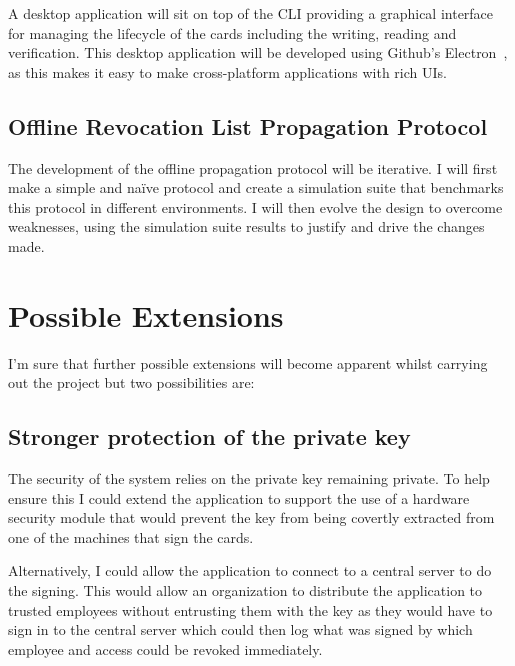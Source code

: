 \documentclass[a4paper, 12pt]{article}
\begin{document}
  A desktop application will sit on top of the CLI providing a graphical
  interface for managing the lifecycle of the cards including the writing,
  reading and verification. This desktop application will be developed using
  Github's Electron~\cite{electron}, as this makes it easy to make
  cross-platform applications with rich UIs.


  \subsection*{Offline Revocation List Propagation Protocol}

  The development of the offline propagation protocol will be iterative. I will
  first make a simple and naïve protocol and create a simulation suite that
  benchmarks this protocol in different environments\footnotemark{}. I will then
  evolve the design to overcome weaknesses, using the simulation suite results
  to justify and drive the changes made.


  \section*{Possible Extensions}

  I'm sure that further possible extensions will become apparent whilst carrying
  out the project but two possibilities are:


  \subsection*{Stronger protection of the private key}

  The security of the system relies on the private key remaining private. To
  help ensure this I could extend the application to support the use of a
  hardware security module that would prevent the key from being covertly
  extracted from one of the machines that sign the cards.

  Alternatively, I could allow the application to connect to a central server to
  do the signing. This would allow an organization to distribute the application
  to trusted employees without entrusting them with the key as they would have
  to sign in to the central server\footnotemark{} which could then log what was
  signed by which employee and access could be revoked immediately.
\end{document}
